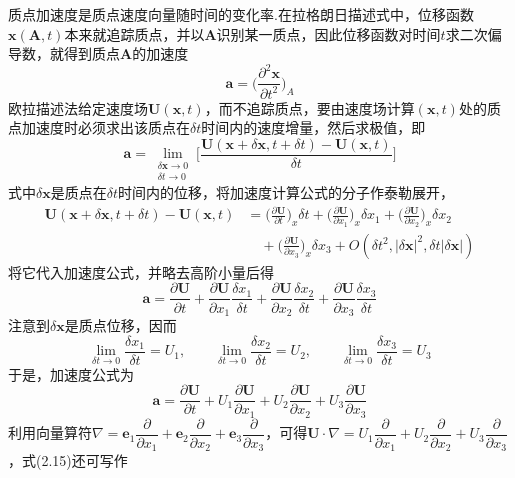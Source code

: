 质点加速度是质点速度向量随时间的变化率.在拉格朗日描述式中，位移函数$\boldsymbol{x}(\boldsymbol{A},t)$本来就追踪质点，并以$\boldsymbol{A}$识别某一质点，因此位移函数对时间$t$求二次偏导数，就得到质点$\boldsymbol{A}$的加速度
\begin{equation*}
\boldsymbol{a}=\Big(\frac{\partial^{2}\boldsymbol{x}}{\partial t^{2}}\Big)_{\!A}
\tag{2.14}
\end{equation*}
欧拉描述法给定速度场$\boldsymbol{U}(\boldsymbol{x},t)$，而不追踪质点，要由速度场计算$(\boldsymbol{x},t)$处的质点加速度时必须求出该质点在$\delta t$时间内的速度增量，然后求极值，即
\[
\boldsymbol{a}=\lim_{\substack{\delta\boldsymbol{x}\to 0\\ \delta t\to 0}}\bigg[\frac{\boldsymbol{U}(\boldsymbol{x}+\delta\boldsymbol{x},t+\delta t)-\boldsymbol{U}(\boldsymbol{x},t)}{\delta t}\bigg]
\]
式中$\delta\boldsymbol{x}$是质点在$\delta t$时间内的位移，将加速度计算公式的分子作泰勒展开，
\begin{align*}
\boldsymbol{U}(\boldsymbol{x}+\delta\boldsymbol{x},t+\delta t)-\boldsymbol{U}(\boldsymbol{x},t)&=\Big(\frac{\partial\boldsymbol{U}}{\partial t}\Big)_{\!x}\delta t+\Big(\frac{\partial\boldsymbol{U}}{\partial x_1}\Big)_{\!x}\delta x_1+\Big(\frac{\partial\boldsymbol{U}}{\partial x_2}\Big)_{\!x}\delta x_2\\
&\quad+\Big(\frac{\partial\boldsymbol{U}}{\partial x_3}\Big)_{\!x}\delta x_3+O(\delta t^{2},|\delta\boldsymbol{x}|^{2},\delta t|\delta\boldsymbol{x}|)
\end{align*}
将它代入加速度公式，并略去高阶小量后得
\[
\boldsymbol{a}=\frac{\partial\boldsymbol{U}}{\partial t}+\frac{\partial\boldsymbol{U}}{\partial x_1}\frac{\delta x_1}{\delta t}+\frac{\partial\boldsymbol{U}}{\partial x_2}\frac{\delta x_2}{\delta t}+\frac{\partial\boldsymbol{U}}{\partial x_3}\frac{\delta x_3}{\delta t}
\]
注意到$\delta\boldsymbol{x}$是质点位移，因而
\[
\lim_{\delta t\to 0}\frac{\delta x_1}{\delta t}=U_1,\qquad \lim_{\delta t\to 0}\frac{\delta x_2}{\delta t}=U_2,\qquad \lim_{\delta t\to 0}\frac{\delta x_3}{\delta t}=U_3
\]
于是，加速度公式为
\begin{equation*}
\boldsymbol{a}=\frac{\partial\boldsymbol{U}}{\partial t}+U_1\frac{\partial\boldsymbol{U}}{\partial x_1}+U_2\frac{\partial\boldsymbol{U}}{\partial x_2}+U_3\frac{\partial\boldsymbol{U}}{\partial x_3}
\tag{2.15}
\end{equation*}
利用向量算符$\nabla=\boldsymbol{e}_1\dfrac{\partial}{\partial x_1}+\boldsymbol{e}_2\dfrac{\partial}{\partial x_2}+\boldsymbol{e}_3\dfrac{\partial}{\partial x_3}$，可得$\boldsymbol{U}\cdot\nabla=U_1\dfrac{\partial}{\partial x_1}+U_2\dfrac{\partial}{\partial x_2}+U_3\dfrac{\partial}{\partial x_3}$，式(2.15)还可写作
